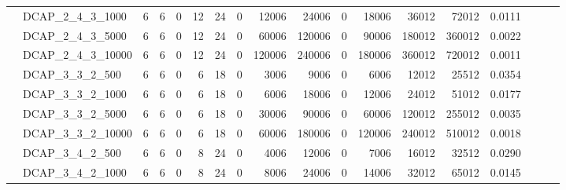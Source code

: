 \begin{table}[H]
{\begin{tabular}{llrrrrrrrrrrrrrlll}
			& DCAP\_2\_4\_3\_1000          & 6            & 6           & 0          & 12           & 24          & 0          & 12006   & 24006    & 0      & 18006   & 36012    & 72012      & 0.0111    &                          &                          &                          \\
			& DCAP\_2\_4\_3\_5000          & 6            & 6           & 0          & 12           & 24          & 0          & 60006   & 120006   & 0      & 90006   & 180012   & 360012     & 0.0022    &                          &                          &                          \\
			& DCAP\_2\_4\_3\_10000         & 6            & 6           & 0          & 12           & 24          & 0          & 120006  & 240006   & 0      & 180006  & 360012   & 720012     & 0.0011    &                          &                          &                          \\
			& DCAP\_3\_3\_2\_500           & 6            & 6           & 0          & 6            & 18          & 0          & 3006    & 9006     & 0      & 6006    & 12012    & 25512      & 0.0354    &                          &                          &                          \\
			& DCAP\_3\_3\_2\_1000          & 6            & 6           & 0          & 6            & 18          & 0          & 6006    & 18006    & 0      & 12006   & 24012    & 51012      & 0.0177    &                          &                          &                          \\
			& DCAP\_3\_3\_2\_5000          & 6            & 6           & 0          & 6            & 18          & 0          & 30006   & 90006    & 0      & 60006   & 120012   & 255012     & 0.0035    &                          &                          &                          \\
			& DCAP\_3\_3\_2\_10000         & 6            & 6           & 0          & 6            & 18          & 0          & 60006   & 180006   & 0      & 120006  & 240012   & 510012     & 0.0018    &                          &                          &                          \\
			& DCAP\_3\_4\_2\_500           & 6            & 6           & 0          & 8            & 24          & 0          & 4006    & 12006    & 0      & 7006    & 16012    & 32512      & 0.0290    &                          &                          &                          \\
			& DCAP\_3\_4\_2\_1000          & 6            & 6           & 0          & 8            & 24          & 0          & 8006    & 24006    & 0      & 14006   & 32012    & 65012      & 0.0145    &                          &                          &                          \\

\end{tabular}}
\end{table}
